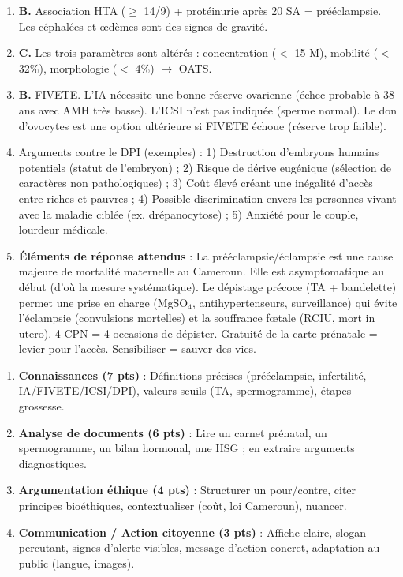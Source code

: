 \documentclass[11pt]{article}
\begin{document}
\begin{corrige}[Exercice n°1]
\begin{enumerate}
\item \textbf{B.} Association HTA ($\geq$ 14/9) + protéinurie après 20 SA = prééclampsie. Les céphalées et œdèmes sont des signes de gravité.
\item \textbf{C.} Les trois paramètres sont altérés : concentration ($<$ 15 M), mobilité ($<$ 32\%), morphologie ($<$ 4\%) $\rightarrow$ OATS.
\item \textbf{B.} FIVETE. L'IA nécessite une bonne réserve ovarienne (échec probable à 38 ans avec AMH très basse). L'ICSI n'est pas indiquée (sperme normal). Le don d'ovocytes est une option ultérieure si FIVETE échoue (réserve trop faible).
\item Arguments contre le DPI (exemples) : 1) Destruction d'embryons humains potentiels (statut de l'embryon) ; 2) Risque de dérive eugénique (sélection de caractères non pathologiques) ; 3) Coût élevé créant une inégalité d'accès entre riches et pauvres ; 4) Possible discrimination envers les personnes vivant avec la maladie ciblée (ex. drépanocytose) ; 5) Anxiété pour le couple, lourdeur médicale.
\item \textbf{Éléments de réponse attendus} : La prééclampsie/éclampsie est une cause majeure de mortalité maternelle au Cameroun. Elle est asymptomatique au début (d'où la mesure systématique). Le dépistage précoce (TA + bandelette) permet une prise en charge (MgSO$_4$, antihypertenseurs, surveillance) qui évite l'éclampsie (convulsions mortelles) et la souffrance fœtale (RCIU, mort in utero). 4 CPN = 4 occasions de dépister. Gratuité de la carte prénatale = levier pour l'accès. Sensibiliser = sauver des vies.
\end{enumerate}
\end{corrige}

\begin{methode}
\begin{enumerate}
\item \textbf{Connaissances (7 pts)} : Définitions précises (prééclampsie, infertilité, IA/FIVETE/ICSI/DPI), valeurs seuils (TA, spermogramme), étapes grossesse.
\item \textbf{Analyse de documents (6 pts)} : Lire un carnet prénatal, un spermogramme, un bilan hormonal, une HSG ; en extraire arguments diagnostiques.
\item \textbf{Argumentation éthique (4 pts)} : Structurer un pour/contre, citer principes bioéthiques, contextualiser (coût, loi Cameroun), nuancer.
\item \textbf{Communication / Action citoyenne (3 pts)} : Affiche claire, slogan percutant, signes d'alerte visibles, message d'action concret, adaptation au public (langue, images).
\end{enumerate}
\end{methode}
\end{document}
